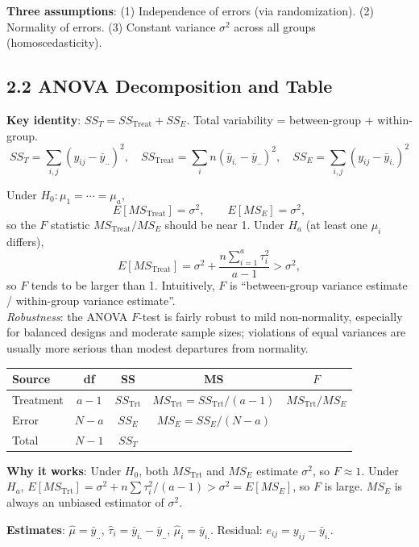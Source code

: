 \documentclass[9pt,letterpaper]{article}
\begin{document}
\textbf{Three assumptions}: (1) Independence of errors (via randomization). (2) Normality of errors. (3) Constant variance $\sigma^2$ across all groups (homoscedasticity).

\subsection{2.2 ANOVA Decomposition and Table}

\textbf{Key identity}: $SS_T = SS_{\text{Treat}} + SS_E$. Total variability = between-group + within-group.
\[
SS_T = \sum_{i,j}(y_{ij}-\bar{y}_{..})^2, \quad SS_{\text{Treat}} = \sum_i n(\bar{y}_{i.}-\bar{y}_{..})^2, \quad SS_E = \sum_{i,j}(y_{ij}-\bar{y}_{i.})^2
\]

Under $H_0:\mu_1=\cdots=\mu_a$,
\[
E[MS_{\text{Treat}}]=\sigma^2,\qquad E[MS_E]=\sigma^2,
\]
so the $F$ statistic $MS_{\text{Treat}}/MS_E$ should be near 1. Under $H_a$ (at least one $\mu_i$ differs),
\[
E[MS_{\text{Treat}}]=\sigma^2 + \frac{n\sum_{i=1}^a\tau_i^2}{a-1}>\sigma^2,
\]
so $F$ tends to be larger than 1. Intuitively, $F$ is ``between-group variance estimate / within-group variance estimate''.\\[2pt]
\textit{Robustness}: the ANOVA $F$-test is fairly robust to mild non-normality, especially for balanced designs and moderate sample sizes; violations of equal variances are usually more serious than modest departures from normality.

\begin{center}\small
\begin{tabular}{@{}lcccc@{}}
\toprule
Source & df & SS & MS & $F$ \\
\midrule
Treatment & $a-1$ & $SS_{\text{Trt}}$ & $MS_{\text{Trt}} = SS_{\text{Trt}}/(a-1)$ & $MS_{\text{Trt}}/MS_E$ \\
Error & $N-a$ & $SS_E$ & $MS_E = SS_E/(N-a)$ & \\
Total & $N-1$ & $SS_T$ & & \\
\bottomrule
\end{tabular}
\end{center}

\textbf{Why it works}: Under $H_0$, both $MS_{\text{Trt}}$ and $MS_E$ estimate $\sigma^2$, so $F \approx 1$. Under $H_a$, $E[MS_{\text{Trt}}] = \sigma^2 + n\sum\tau_i^2/(a-1) > \sigma^2 = E[MS_E]$, so $F$ is large. $MS_E$ is always an unbiased estimator of $\sigma^2$.

\textbf{Estimates}: $\hat\mu=\bar{y}_{..}$, $\hat\tau_i=\bar{y}_{i.}-\bar{y}_{..}$, $\hat\mu_i=\bar{y}_{i.}$. Residual: $e_{ij}=y_{ij}-\bar{y}_{i.}$.
\end{document}

